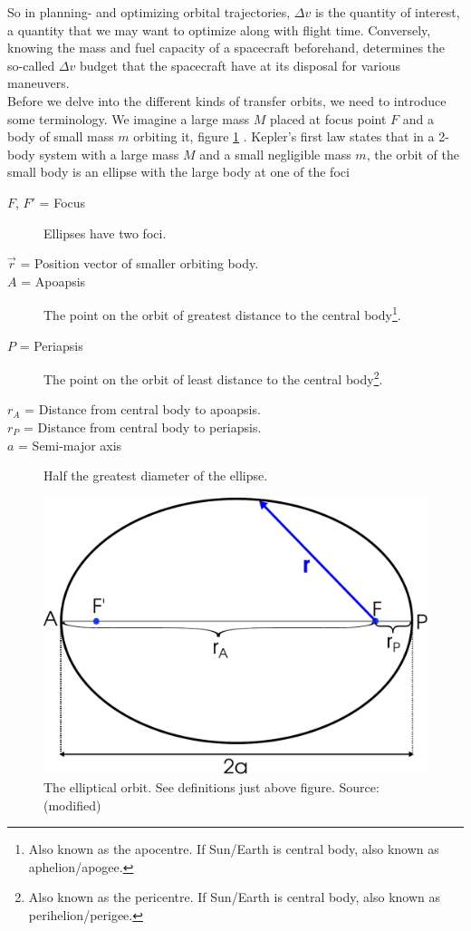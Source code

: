 So in planning- and optimizing orbital trajectories, $\Delta v$ is the quantity of interest, a quantity that we may want to optimize along with flight time. Conversely, knowing the mass and fuel capacity of a spacecraft beforehand, determines the so-called $\Delta v$ budget that the spacecraft have at its disposal for various maneuvers.
\\
Before we delve into the different kinds of transfer orbits, we need to introduce some terminology. We imagine a large mass $M$ placed at focus point $F$ and a body of small mass $m$ orbiting it, figure \ref{fig:ellipse} \cite{Murray1999}. Kepler's first law states that in a 2-body system with a large mass $M$ and a small negligible mass $m$, the orbit of the small body is an ellipse with the large body at one of the foci \cite{Knudsen2002}
\begin{description}
    \item[$F$, $F'$ = Focus] Ellipses have two foci.
    \item[$\vec{r}$ = Position vector of smaller orbiting body.]
    \item[$A$ = Apoapsis] The point on the orbit of greatest distance to the central body\footnote{Also known as the apocentre. If Sun/Earth is central body, also known as aphelion/apogee.}.
    \item[$P$ = Periapsis] The point on the orbit of least distance to the central body\footnote{Also known as the pericentre. If Sun/Earth is central body, also known as perihelion/perigee.}.
    \item[$r_A$ = Distance from central body to apoapsis.]
    \item[$r_P$ = Distance from central body to periapsis.]
    \item[$a$ = Semi-major axis] Half the greatest diameter of the ellipse.
\end{description}

\begin{figure}[ht!]
\centering
\includegraphics[scale=0.51]{fig/ellipse.pdf}
\caption{The elliptical orbit. See definitions just above figure. Source: \cite{fig-ellipse} (modified)}
\label{fig:ellipse}
\end{figure}


